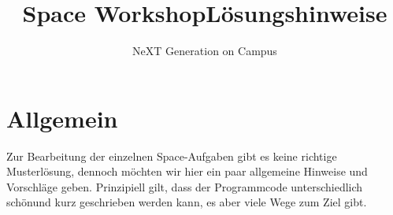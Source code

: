 \documentclass[
	ngerman,
	accentcolor=1c,%
	marginpar=false,
	identbarcolor=1c,
	]{tudapub}
\begin{document}




\title{Space Workshop\newline L\"osungshinweise}
\subtitle{NeXT Generation on Campus}
\date{}





\maketitle


\newpage
\section{Allgemein}
Zur Bearbeitung der einzelnen Space-Aufgaben gibt es keine richtige Musterl\"osung, dennoch m\"ochten wir hier ein paar allgemeine Hinweise und Vorschl\"age geben. Prinzipiell gilt, dass der Programmcode unterschiedlich \glqq{}sch\"on\grqq und kurz geschrieben werden kann, es aber viele Wege zum Ziel gibt.
\end{document}
